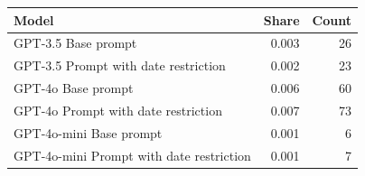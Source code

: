 
\begin{tabular}{lrr}
\toprule
Model & Share & Count\\
\midrule
GPT-3.5 Base prompt & 0.003 & 26\\
GPT-3.5 Prompt with date restriction & 0.002 & 23\\
\midrule
GPT-4o Base prompt & 0.006 & 60\\
GPT-4o Prompt with date restriction & 0.007 & 73\\
\midrule
GPT-4o-mini Base prompt & 0.001 & 6\\
GPT-4o-mini Prompt with date restriction & 0.001 & 7\\
\bottomrule
\end{tabular}
